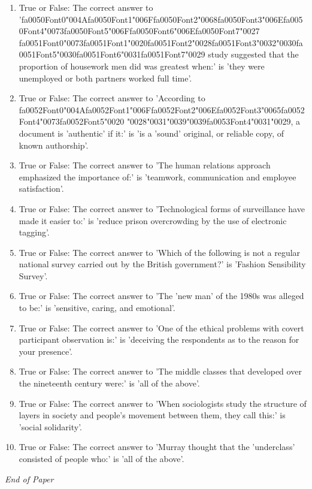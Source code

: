 \documentclass[12pt]{article}
\begin{document}
\begin{enumerate}[label=\arabic*.]
\item True or False: The correct answer to '{\csname fa0050Font0\endcsname\char"004A}{\csname fa0050Font1\endcsname\char"006F}{\csname fa0050Font2\endcsname\char"0068}{\csname fa0050Font3\endcsname\char"006E}{\csname fa0050Font4\endcsname\char"0073}{\csname fa0050Font5\endcsname\char"006F}{\csname fa0050Font6\endcsname\char"006E}{\csname fa0050Font7\endcsname\char"0027} {\csname fa0051Font0\endcsname\char"0073}{\csname fa0051Font1\endcsname\char"0020}{\csname fa0051Font2\endcsname\char"0028}{\csname fa0051Font3\endcsname\char"0032}{\char"0030}{\csname fa0051Font5\endcsname\char"0030}{\csname fa0051Font6\endcsname\char"0031}{\csname fa0051Font7\endcsname\char"0029} study suggested that the proportion of housework men did was greatest when:' is 'they were unemployed or both partners worked full time'.
\item True or False: The correct answer to 'According to {\csname fa0052Font0\endcsname\char"004A}{\csname fa0052Font1\endcsname\char"006F}{\csname fa0052Font2\endcsname\char"006E}{\csname fa0052Font3\endcsname\char"0065}{\csname fa0052Font4\endcsname\char"0073}{\csname fa0052Font5\endcsname\char"0020} {\char"0028}{\char"0031}{\char"0039}{\char"0039}{\csname fa0053Font4\endcsname\char"0031}{\char"0029}, a document is 'authentic' if it:' is 'is a 'sound' original, or reliable copy, of known authorship'.
\item True or False: The correct answer to 'The human relations approach emphasized the importance of:' is 'teamwork, communication and employee satisfaction'.
\item True or False: The correct answer to 'Technological forms of surveillance have made it easier to:' is 'reduce prison overcrowding by the use of electronic tagging'.
\item True or False: The correct answer to 'Which of the following is not a regular national survey carried out by the British government?' is 'Fashion Sensibility Survey'.
\item True or False: The correct answer to 'The 'new man' of the 1980s was alleged to be:' is 'sensitive, caring, and emotional'.
\item True or False: The correct answer to 'One of the ethical problems with covert participant observation is:' is 'deceiving the respondents as to the reason for your presence'.
\item True or False: The correct answer to 'The middle classes that developed over the nineteenth century were:' is 'all of the above'.
\item True or False: The correct answer to 'When sociologists study the structure of layers in society and people's movement between them, they call this:' is 'social solidarity'.
\item True or False: The correct answer to 'Murray thought that the 'underclass' consisted of people who:' is 'all of the above'.
\end{enumerate}

\vfill
\noindent\textit{End of Paper}
\end{document}
